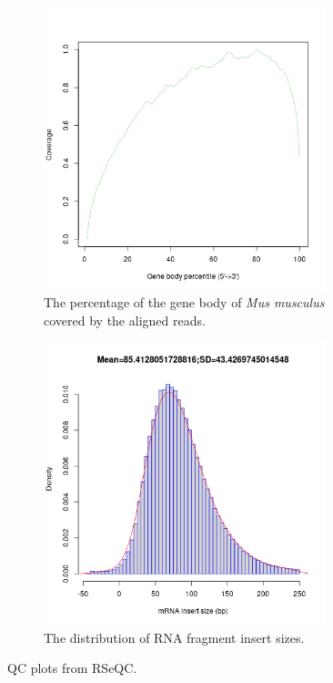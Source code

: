 \documentclass{article}
\begin{document}
\begin{figure}[h]
     \centering
     \begin{subfigure}[b]{0.5\textwidth}
         \centering
         \includegraphics[width=0.9\textwidth]{plots/gene_coverage.png}
         \caption{The percentage of the gene body of \textit{Mus musculus} covered by the aligned reads.}
     \end{subfigure}%
     \hfill
     \begin{subfigure}[b]{0.5\textwidth}
         \centering
         \includegraphics[width=0.9\textwidth]{plots/inner_distance.png}
         \caption{The distribution of RNA fragment insert sizes.}
     \end{subfigure}
     \hfill
        \caption{QC plots from RSeQC.}
        \label{fig:two graphs}
\end{figure}
\end{document}
